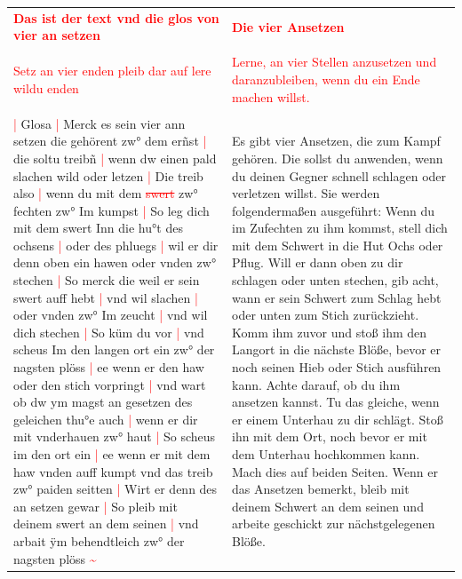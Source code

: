 \begin{longtable}{p{6.25cm}p{6.25cm}}
    \textbf{\textcolor{red}{
        Das ist der text vnd die glos von vier an setzen}}
    &
    \textbf{\textcolor{red}{
        Die vier Ansetzen}}
    \\
    \\
    \textcolor{red}{
        Setz an vier enden pleib dar auf lere wildu enden}
    &
    \textcolor{red}{
        Lerne, an vier Stellen anzusetzen und daranzubleiben, wenn du ein Ende machen willst.}
    \\
    \\
    \textcolor{red}{|} Glosa
    \textcolor{red}{|} Merck es sein vier ann setzen die gehörent zw° dem erñst
    \textcolor{red}{|} die soltu treibñ
    \textcolor{red}{|} wenn dw einen pald slachen wild oder letzen
    \textcolor{red}{|} Die treib also
    \textcolor{red}{|} wenn du mit dem \textcolor{red}{\st{swert}} zw° fechten zw° Im kumpst
    \textcolor{red}{|} So leg dich mit dem swert Inn die hu°t des ochsens
    \textcolor{red}{|} oder des phluegs
    \textcolor{red}{|} wil er dir denn oben ein hawen oder vnden zw° stechen
    \textcolor{red}{|} So merck die weil er sein swert auff hebt
    \textcolor{red}{|} vnd wil slachen
    \textcolor{red}{|} oder vnden zw° Im zeucht
    \textcolor{red}{|} vnd wil dich stechen
    \textcolor{red}{|} So küm du vor
    \textcolor{red}{|} vnd scheus Im den langen ort ein zw° der nagsten plöss
    \textcolor{red}{|} ee wenn er den haw oder den stich vorpringt
    \textcolor{red}{|} vnd wart ob dw ym magst an gesetzen des geleichen thu°e auch
    \textcolor{red}{|} wenn er dir mit vnderhauen zw° haut
    \textcolor{red}{|} So scheus im den ort ein
    \textcolor{red}{|} ee wenn er mit dem haw vnden auff kumpt vnd das treib zw° paiden seitten
    \textcolor{red}{|} Wirt er denn des an setzen gewar
    \textcolor{red}{|} So pleib mit deinem swert an dem seinen
    \textcolor{red}{|} vnd arbait ÿm behendtleich zw° der nagsten plöss \textcolor{red}{\textasciitilde{}}
    &
    Es gibt vier Ansetzen, die zum Kampf gehören. Die sollst du anwenden, wenn du deinen Gegner schnell schlagen oder verletzen willst.
    Sie werden folgendermaßen ausgeführt: Wenn du im Zufechten zu ihm kommst, stell dich mit dem Schwert in die Hut Ochs oder Pflug.
    Will er dann oben zu dir schlagen oder unten stechen, gib acht, wann er sein Schwert zum Schlag hebt oder unten zum Stich zurückzieht.
    Komm ihm zuvor und stoß ihm den Langort in die nächste Blöße, bevor er noch seinen Hieb oder Stich ausführen kann.
    Achte darauf, ob du ihm ansetzen kannst.
    Tu das gleiche, wenn er einem Unterhau zu dir schlägt.
    Stoß ihn mit dem Ort, noch bevor er mit dem Unterhau hochkommen kann.
    Mach dies auf beiden Seiten.
    Wenn er das Ansetzen bemerkt, bleib mit deinem Schwert an dem seinen und arbeite geschickt zur nächstgelegenen Blöße.
\end{longtable}

